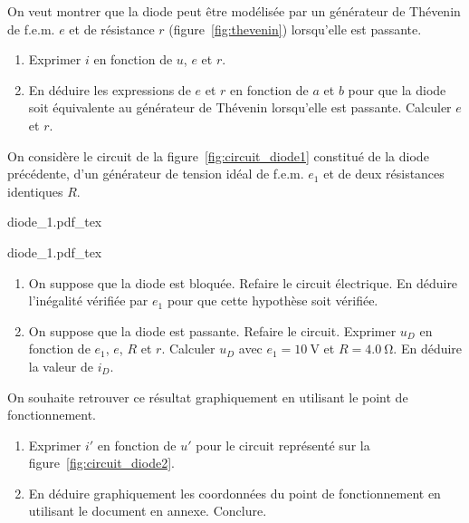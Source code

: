 \documentclass[a4paper, 10pt, garamond, oneside]{book}
\begin{document}
{	On veut montrer que la diode peut être modélisée par un générateur de
	Thévenin de f.e.m. $e$ et de résistance $r$ (figure~\ref{fig:thevenin})
	lorsqu'elle est passante.
	\begin{enumerate}[resume]
		\item Exprimer $i$ en fonction de $u$, $e$ et $r$.
		\item En déduire les expressions de $e$ et $r$ en fonction de $a$ et $b$ pour que la diode soit équivalente au générateur de Thévenin lorsqu'elle est passante. Calculer $e$ et $r$.
	\end{enumerate}
	On considère le circuit de la figure~\ref{fig:circuit_diode1} constitué de la diode précédente, d'un générateur de tension idéal de f.e.m. $e_1$ et de deux résistances identiques $R$.
	\smallbreak
	\noindent
	\begin{minipage}[t]{.5\linewidth}
		\begin{center}
			{diode_1.pdf_tex}
			\label{fig:circuit_diode1}
		\end{center}
	\end{minipage}
	\begin{minipage}[t]{.5\linewidth}
		\begin{center}
			{diode_1.pdf_tex}
			\label{fig:circuit_diode2}
		\end{center}
	\end{minipage}
	\begin{enumerate}[resume]
		\item On suppose que la diode est bloquée. Refaire le circuit électrique. En déduire l'inégalité vérifiée par $e_1$ pour que cette hypothèse soit vérifiée.
		\item On suppose que la diode est passante. Refaire le circuit. Exprimer $u_D$ en fonction de $e_1$, $e$, $R$ et $r$. Calculer $u_D$ avec $e_1=\SI{10}{\volt}$ et $R=\SI{4.0}{\ohm}$. En déduire la valeur de $i_D$.
	\end{enumerate}

	On souhaite retrouver ce résultat graphiquement en utilisant le point de fonctionnement.
	\begin{enumerate}[resume]
		\item Exprimer $i'$ en fonction de $u'$ pour le circuit représenté sur la figure~\ref{fig:circuit_diode2}.
		\item En déduire graphiquement les coordonnées du point de fonctionnement en utilisant le document en annexe. Conclure.
	\end{enumerate}
}
\end{document}
